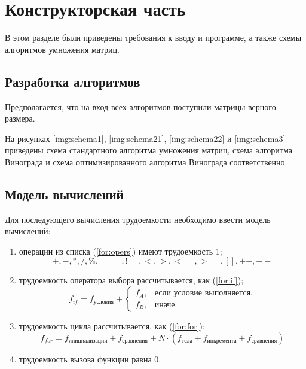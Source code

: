 \chapter{Конструкторская часть}
В этом разделе были приведены требования к вводу и программе, а также схемы алгоритмов умножения матриц.

\section{Разработка алгоритмов}

Предполагается, что на вход всех алгоритмов поступили матрицы верного размера.

На рисунках \ref{img:schema1}, \ref{img:schema21}, \ref{img:schema22} и \ref{img:schema3} приведены схема стандартного алгоритма умножения матриц, схема алгоритма Винограда и схема оптимизированного алгоритма Винограда соответственно.

\clearpage

\clearpage

\clearpage

\clearpage


\section{Модель вычислений}

Для последующего вычисления трудоемкости необходимо ввести модель вычислений:
\begin{enumerate}
	\item операции из списка (\ref{for:opers}) имеют трудоемкость 1;
	\begin{equation}
		\label{for:opers}
		+, -, *, /, \%, ==, !=, <, >, <=, >=, [], ++, {-}-
	\end{equation}
	\item трудоемкость оператора выбора  рассчитывается, как (\ref{for:if});
	\begin{equation}
		\label{for:if}
		f_{if} = f_{\text{условия}} +
		\begin{cases}
			f_A, & \text{если условие выполняется,}\\
			f_B, & \text{иначе.}
		\end{cases}
	\end{equation}
	\item трудоемкость цикла рассчитывается, как (\ref{for:for});
	\begin{equation}
		\label{for:for}
		f_{for} = f_{\text{инициализации}} + f_{\text{сравнения}} + N\cdot(f_{\text{тела}} + f_{\text{инкремента}} + f_{\text{сравнения}})
	\end{equation}
	\item трудоемкость вызова функции равна 0.
\end{enumerate}


